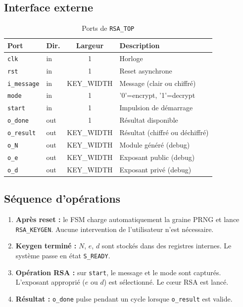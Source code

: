 \subsection{Interface externe}
\begin{table}[H]
\centering
\caption{Ports de \texttt{RSA\_TOP}}
\begin{tabular}{llcp{5cm}}
\toprule
\textbf{Port} & \textbf{Dir.} & \textbf{Largeur} & \textbf{Description} \\
\midrule
\texttt{clk}       & in  & 1 & Horloge \\
\texttt{rst}       & in  & 1 & Reset asynchrone \\
\texttt{i\_message} & in  & KEY\_WIDTH & Message (clair ou chiffré) \\
\texttt{mode}      & in  & 1 & '0'=encrypt, '1'=decrypt \\
\texttt{start}     & in  & 1 & Impulsion de démarrage \\
\texttt{o\_done}    & out & 1 & Résultat disponible \\
\texttt{o\_result}  & out & KEY\_WIDTH & Résultat (chiffré ou déchiffré) \\
\texttt{o\_N}       & out & KEY\_WIDTH & Module généré (debug) \\
\texttt{o\_e}       & out & KEY\_WIDTH & Exposant public (debug) \\
\texttt{o\_d}       & out & KEY\_WIDTH & Exposant privé (debug) \\
\bottomrule
\end{tabular}
\end{table}

\subsection{Séquence d'opérations}

\begin{enumerate}
  \item \textbf{Après reset :} le FSM charge automatiquement la graine
        PRNG et lance \texttt{RSA\_KEYGEN}. Aucune intervention de
        l'utilisateur n'est nécessaire.
  \item \textbf{Keygen terminé :} $N$, $e$, $d$ sont stockés dans des
        registres internes. Le système passe en état \texttt{S\_READY}.
  \item \textbf{Opération RSA :} sur \texttt{start}, le message et le mode
        sont capturés. L'exposant approprié ($e$ ou $d$) est sélectionné.
        Le cœur RSA est lancé.
  \item \textbf{Résultat :} \texttt{o\_done} pulse pendant un cycle
        lorsque \texttt{o\_result} est valide.
\end{enumerate}


